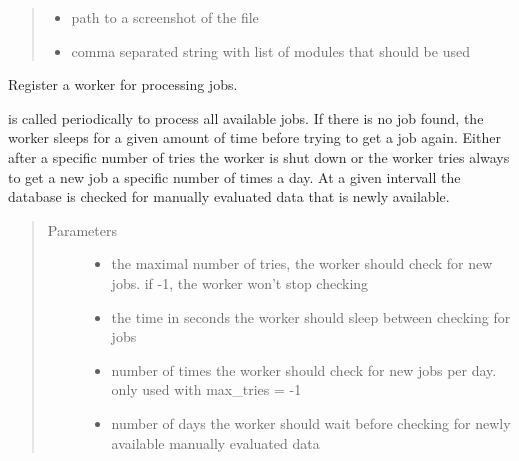 \documentclass[letterpaper,10pt,english]{sphinxmanual}
\begin{document}
\begin{fulllineitems}
\begin{fulllineitems}
\begin{quote}
\begin{description}
\begin{itemize}
\item {} 
 \textendash{} path to a screenshot of the file

\item {} 
 \textendash{} comma separated string with list of modules
that should be used

\end{itemize}

\end{description}\end{quote}

\end{fulllineitems}


\begin{fulllineitems}
\label{\detokenize{api:worker.Worker.schedule}}
Register a worker for processing jobs.

{\hyperref[\detokenize{api:worker.Worker.get_job_and_process}]{}} is called periodically to process
all available jobs. If there is no job found, the worker
sleeps for a given amount of time before trying to get a job
again. Either after a specific number of tries the worker is
shut down or the worker tries always to get a new job a
specific number of times a day. At a given intervall the
database is checked for manually evaluated data that is newly
available.
\begin{quote}\begin{description}
\item[{Parameters}] \leavevmode\begin{itemize}
\item {} 
 \textendash{} the maximal number of tries, the worker should
check for new jobs. if -1, the worker won’t stop checking

\item {} 
 \textendash{} the time in seconds the worker should sleep between
checking for jobs

\item {} 
 \textendash{} number of times the worker should check for new jobs per
day. only used with max\_tries = -1

\item {} 
 \textendash{} number of days the worker should wait before
checking for newly available manually evaluated data


\end{itemize}
\end{description}
\end{quote}
\end{fulllineitems}
\end{fulllineitems}
\end{document}
